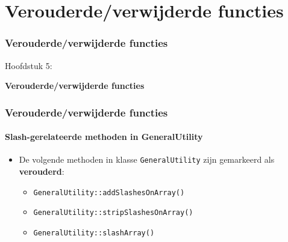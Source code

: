 %

\section{Verouderde/verwijderde functies}
\begin{frame}[fragile]
	\frametitle{Verouderde/verwijderde functies}

	\begin{center}\huge{Hoofdstuk 5:}\end{center}
	\begin{center}\huge{\color{typo3darkgrey}\textbf{Verouderde/verwijderde functies}}\end{center}

\end{frame}


\begin{frame}[fragile]
	\frametitle{Verouderde/verwijderde functies}
	\framesubtitle{Slash-gerelateerde methoden in GeneralUtility}

	\begin{itemize}

		\item De volgende methoden in klasse \texttt{GeneralUtility} zijn gemarkeerd als
			 \textbf{verouderd}:

			\begin{itemize}
				\item \texttt{GeneralUtility::addSlashesOnArray()}
				\item \texttt{GeneralUtility::stripSlashesOnArray()}
				\item \texttt{GeneralUtility::slashArray()}
			\end{itemize}

	\end{itemize}

\end{frame}

